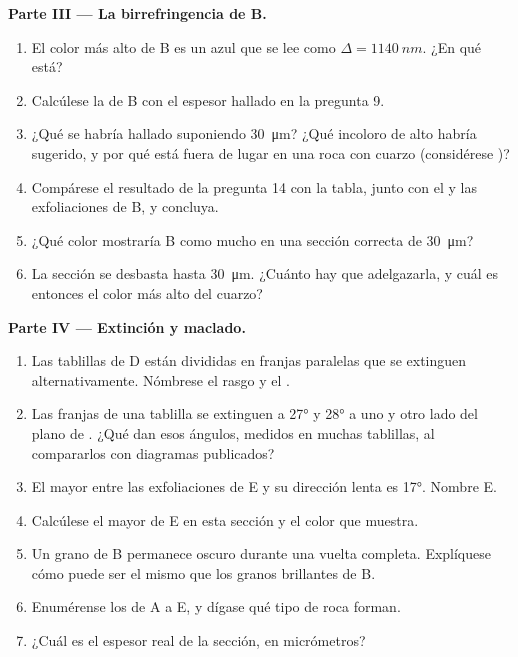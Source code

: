 \begin{problem}
\medskip
\noindent\textbf{Parte III --- La birrefringencia de B.}
\begin{enumerate}[resume]
  \item El color más alto de B es un azul que se lee como $\Delta = \qty{1140}{nm}$. ¿En qué  está?
  \item Calcúlese la  de B con el espesor hallado en la pregunta 9.
  \item ¿Qué  se habría hallado suponiendo \qty{30}{\micro m}? ¿Qué  incoloro de  alto habría
        sugerido, y por qué está fuera de lugar en una roca con cuarzo (considérese )?
  \item Compárese el resultado de la pregunta 14 con la tabla, junto con el  y las exfoliaciones de B, y concluya.
  \item ¿Qué color mostraría B como mucho en una sección correcta de \qty{30}{\micro m}?
  \item La sección se desbasta hasta \qty{30}{\micro m}. ¿Cuánto hay que adelgazarla, y cuál es entonces el color más alto del cuarzo?
\end{enumerate}

\medskip
\noindent\textbf{Parte IV --- Extinción y maclado.}
\begin{enumerate}[resume]
  \item Las tablillas de D están divididas en franjas paralelas que se extinguen alternativamente. Nómbrese el rasgo y el .
  \item Las franjas de una tablilla se extinguen a \ang{27} y \ang{28} a uno y otro lado del plano de . ¿Qué dan esos
        ángulos, medidos en muchas tablillas, al compararlos con diagramas publicados?
  \item El mayor  entre las exfoliaciones de E y su dirección lenta es \ang{17}. Nombre E.
  \item Calcúlese el mayor  de E en esta sección y el color que muestra.
  \item Un grano de B permanece oscuro durante una vuelta completa. Explíquese cómo puede ser el mismo  que los granos
        brillantes de B.
  \item Enumérense los  de A a E, y dígase qué tipo de roca forman.
  \item ¿Cuál es el espesor real de la sección, en micrómetros?
\end{enumerate}
\end{problem}
